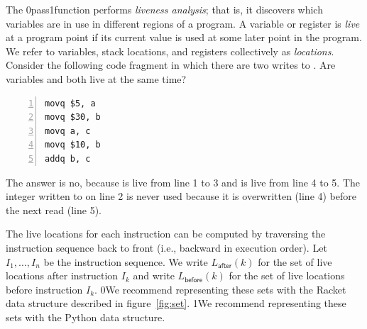 \documentclass[7x10]{TimesAPriori_MIT}%
\def\racketEd{0}
\def\pythonEd{1}
\def\edition{1}
\newcommand{\racket}[1]{{\if\edition\racketEd{#1}\fi}}
\newcommand{\pythonColor}[0]{}
\newcommand{\python}[1]{{\if\edition\pythonEd\pythonColor #1\fi}}
\numberwithin{theorem}{chapter}
\numberwithin{definition}{chapter}
\numberwithin{equation}{chapter}
\begin{document}
The  \racket{pass}\python{function} performs
\emph{liveness analysis}; that is, it discovers which variables are
in use in different regions of a program.
%
A variable or register is \emph{live} at a program point if its
current value is used at some later point in the program.  We refer to
variables, stack locations, and registers collectively as
\emph{locations}.
%
Consider the following code fragment in which there are two writes to
. Are variables  and  both live at the same
time?
\begin{center}
  \begin{minipage}{0.85\textwidth}
\begin{lstlisting}[numbers=left,numberstyle=\tiny]
movq $5, a
movq $30, b
movq a, c
movq $10, b
addq b, c
\end{lstlisting}
\end{minipage}
\end{center}
The answer is no, because  is live from line 1 to 3 and
 is live from line 4 to 5.  The integer written to  on
line 2 is never used because it is overwritten (line 4) before the
next read (line 5).

The live locations for each instruction can be computed by traversing
the instruction sequence back to front (i.e., backward in execution
order).  Let $I_1,\ldots, I_n$ be the instruction sequence. We write
$L_{\mathsf{after}}(k)$ for the set of live locations after
instruction $I_k$ and write $L_{\mathsf{before}}(k)$ for the set of live
locations before instruction $I_k$.  \racket{We recommend representing
  these sets with the Racket  data structure described in
  figure~\ref{fig:set}.}  \python{We recommend representing these sets
  with the Python
  \href{https://docs.python.org/3.10/library/stdtypes.html\#set-types-set-frozenset}{\code{set}}
  data structure.}
\end{document}
